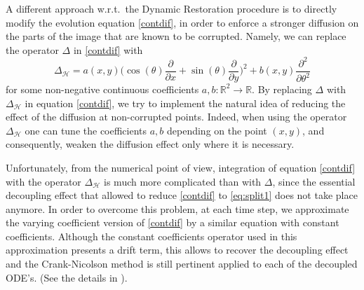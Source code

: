\documentclass[proc]{edpsmath}
\begin{document}
A different approach w.r.t.\ the Dynamic Restoration procedure is to directly modify the evolution equation \eqref{contdif}, in order to enforce a stronger diffusion on the parts of the image that are known to be corrupted.
Namely, we can replace the operator $\Delta$ in \eqref{contdif} with
\begin{equation}
\label{eq:varying}
  \Delta_{\mathcal H} =  a(x,y)\biggl(\cos(\theta)\frac{\partial}{\partial x}+
\sin(\theta)\frac{\partial}{\partial y}\biggr)^{2} +
b(x,y)\frac{\partial^{2}}{\partial\theta^{2}}
\end{equation}
for some non-negative continuous coefficients $a,b:\mathbb R^2\to \mathbb R$.
By replacing $\Delta$ with $\Delta_{\mathcal H}$ in equation  \eqref{contdif},  we try to implement the natural idea of reducing the effect of the diffusion at non-corrupted points. Indeed, when using  the operator $\Delta_{\mathcal H}$  one can tune the coefficients $a, b$ depending on the point $(x, y)$, and consequently, weaken the diffusion effect only where it is necessary.


Unfortunately, from the numerical point of view, integration of  equation  \eqref{contdif} with the operator $\Delta_{\mathcal H}$ is much more complicated than with $\Delta$, since the essential decoupling  effect that allowed to reduce \eqref{contdif} to \eqref{eq:split1} does not take place anymore.
In order to overcome this problem, at each time step, we approximate the varying coefficient version of \eqref{contdif} by a similar equation with constant coefficients. Although the constant coefficients operator used in this approximation presents a drift term, this allows to recover the decoupling effect and the Crank-Nicolson method is still pertinent applied to each of the decoupled ODE's. (See the details in \cite{ahe}).
\end{document}
